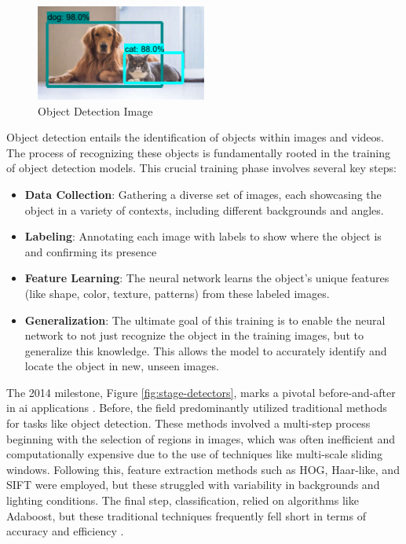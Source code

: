 \begin{figure}[h]
    \centering 
    \includegraphics[width=0.5\textwidth]{figs/object-detection.png} 
    \caption{Object Detection Image~\cite{rfc15}}
    \label{fig:object-detection}
\end{figure}

Object detection entails the identification of objects within images and videos. The process of recognizing these objects is fundamentally rooted in the training of object detection models. This crucial training phase involves several key steps:
\begin{itemize}
    \item \textbf{Data Collection}: Gathering a diverse set of images, each showcasing the object in a variety of contexts, including different backgrounds and angles.
    \item \textbf{Labeling}: Annotating each image with labels to show where the object is and confirming its presence
    \item \textbf{Feature Learning}: The neural network learns the object's unique features (like shape, color, texture, patterns) from these labeled images.
    \item \textbf{Generalization}: The ultimate goal of this training is to enable the neural network to not just recognize the object in the training images, but to generalize this knowledge. This allows the model to accurately identify and locate the object in new, unseen images.
\end{itemize} 

The 2014 milestone, Figure \ref{fig:stage-detectors}, marks a pivotal before-and-after in \ac{ai} applications \cite{rfc22}. Before, the field predominantly utilized traditional methods for tasks like object detection. These methods involved a multi-step process beginning with the selection of regions in images, which was often inefficient and computationally expensive due to the use of techniques like multi-scale sliding windows. Following this, feature extraction methods such as HOG, Haar-like, and SIFT were employed, but these struggled with variability in backgrounds and lighting conditions. The final step, classification, relied on algorithms like Adaboost, but these traditional techniques frequently fell short in terms of accuracy and efficiency \cite{rfc9}.

